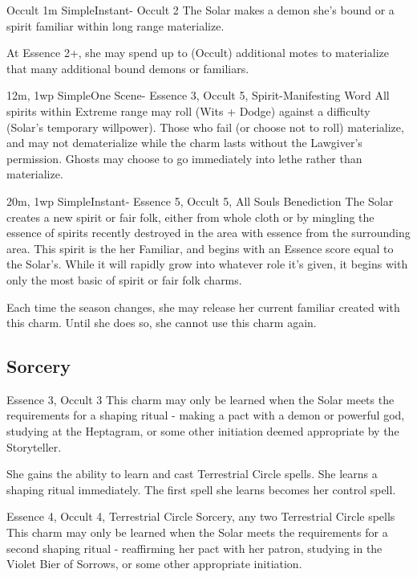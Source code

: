 \begin{Ability}{Occult}
  {1m}
  {Simple}{Instant}{-}
  {Occult 2}
  The Solar makes a demon she's bound or a spirit familiar within long range materialize.

  At Essence 2+, she may spend up to (Occult) additional motes to materialize that many additional bound demons or familiars.

  {12m, 1wp}
  {Simple}{One Scene}{-}
  {Essence 3, Occult 5, Spirit-Manifesting Word}
  All spirits within Extreme range may roll (Wits + Dodge) against a difficulty (Solar's temporary willpower). Those who fail (or choose not to roll) materialize, and may not dematerialize while the charm lasts without the Lawgiver's permission. Ghosts may choose to go immediately into lethe rather than materialize.

  {20m, 1wp}
  {Simple}{Instant}{-}
  {Essence 5, Occult 5, All Souls Benediction}
  The Solar creates a new spirit or fair folk, either from whole cloth or by mingling the essence of spirits recently destroyed in the area with essence from the surrounding area. This spirit is the her Familiar, and begins with an Essence score equal to the Solar's. While it will rapidly grow into whatever role it's given, it begins with only the most basic of spirit or fair folk charms.

  Each time the season changes, she may release her current familiar created with this charm. Until she does so, she cannot use this charm again.

  \subsection*{Sorcery}

  {Essence 3, Occult 3}
  This charm may only be learned when the Solar meets the requirements for a shaping ritual - making a pact with a demon or powerful god, studying at the Heptagram, or some other initiation deemed appropriate by the Storyteller.

  She gains the ability to learn and cast Terrestrial Circle spells. She learns a shaping ritual immediately. The first spell she learns becomes her control spell.

  {Essence 4, Occult 4, Terrestrial Circle Sorcery, any two Terrestrial Circle spells}
  This charm may only be learned when the Solar meets the requirements for a second shaping ritual - reaffirming her pact with her patron, studying in the Violet Bier of Sorrows, or some other appropriate initiation.


\end{Ability}
